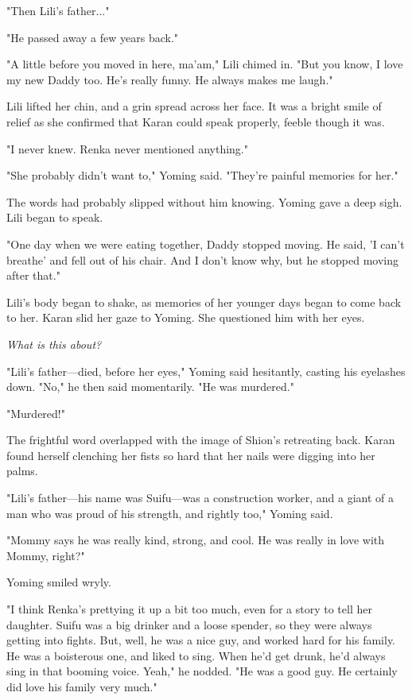 "Then Lili's father..."

"He passed away a few years back."

"A little before you moved in here, ma'am," Lili chimed in. "But you
know, I love my new Daddy too. He's really funny. He always makes me
laugh."

Lili lifted her chin, and a grin spread across her face. It was a bright
smile of relief as she confirmed that Karan could speak properly, feeble
though it was.

"I never knew. Renka never mentioned anything."

"She probably didn't want to," Yoming said. "They're painful memories
for her."

The words had probably slipped without him knowing. Yoming gave a deep
sigh. Lili began to speak.

"One day when we were eating together, Daddy stopped moving. He said, 'I
can't breathe' and fell out of his chair. And I don't know why, but he
stopped moving after that."

Lili's body began to shake, as memories of her younger days began to
come back to her. Karan slid her gaze to Yoming. She questioned him with
her eyes.

\emph{What is this about?}

"Lili's father---died, before her eyes," Yoming said hesitantly, casting
his eyelashes down. "No," he then said momentarily. "He was murdered."

"Murdered!"

The frightful word overlapped with the image of Shion's retreating back.
Karan found herself clenching her fists so hard that her nails were
digging into her palms.

"Lili's father---his name was Suifu---was a construction worker, and a giant
of a man who was proud of his strength, and rightly too," Yoming said.

"Mommy says he was really kind, strong, and cool. He was really in love
with Mommy, right?"

Yoming smiled wryly.

"I think Renka's prettying it up a bit too much, even for a story to
tell her daughter. Suifu was a big drinker and a loose spender, so they
were always getting into fights. But, well, he was a nice guy, and
worked hard for his family. He was a boisterous one, and liked to sing.
When he'd get drunk, he'd always sing in that booming voice. Yeah," he
nodded. "He was a good guy. He certainly did love his family very much."

